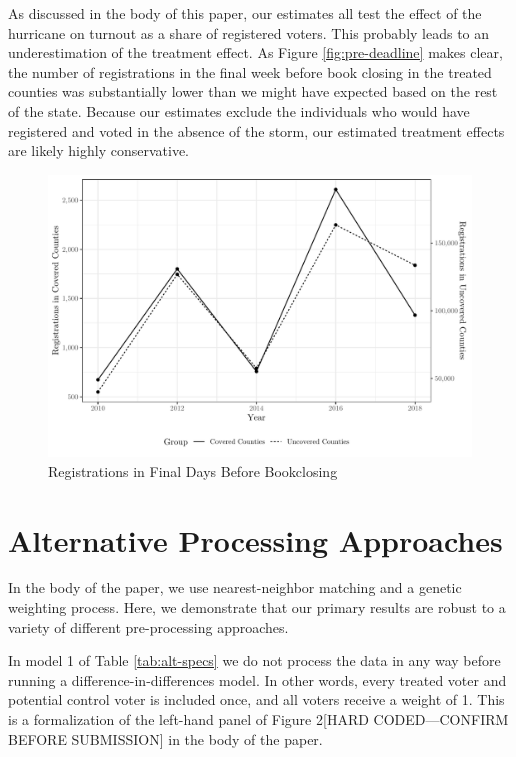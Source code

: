 \documentclass[
  12pt,
]{article}
\begin{document}
As discussed in the body of this paper, our estimates all test the effect of the hurricane on turnout as a share of registered voters. This probably leads to an underestimation of the treatment effect. As Figure \ref{fig:pre-deadline} makes clear, the number of registrations in the final week before book closing in the treated counties was substantially lower than we might have expected based on the rest of the state. Because our estimates exclude the individuals who would have registered and voted in the absence of the storm, our estimated treatment effects are likely highly conservative.

\begin{figure}[H]

{\centering \includegraphics{si_files/figure-latex/regs-chunk-1} 

}

\caption{\label{fig:pre-deadline}Registrations in Final Days Before Bookclosing}\label{fig:regs-chunk}
\end{figure}

\hypertarget{alternative-processing-approaches}{%
\section*{Alternative Processing Approaches}\label{alternative-processing-approaches}}

In the body of the paper, we use nearest-neighbor matching and a genetic weighting process. Here, we demonstrate that our primary results are robust to a variety of different pre-processing approaches.

In model 1 of Table \ref{tab:alt-specs} we do not process the data in any way before running a difference-in-differences model. In other words, every treated voter and potential control voter is included once, and all voters receive a weight of 1. This is a formalization of the left-hand panel of Figure 2{[}HARD CODED---CONFIRM BEFORE SUBMISSION{]} in the body of the paper.
\end{document}
